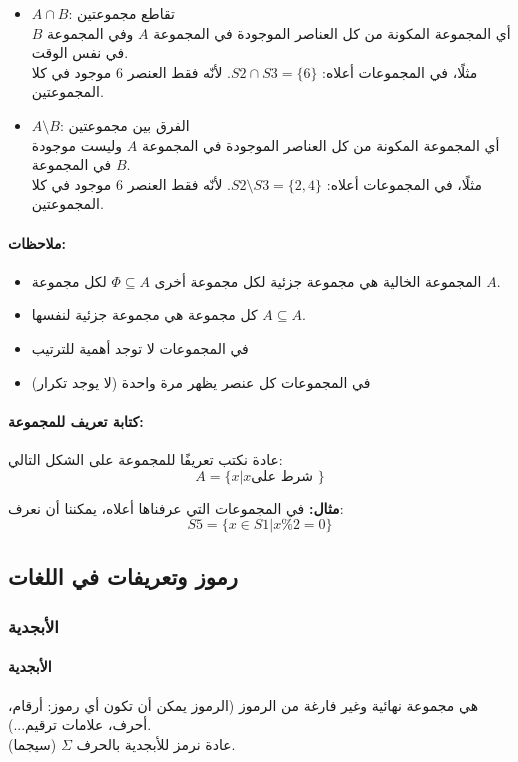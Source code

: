 \documentclass[12pt]{article}
\begin{document}
\begin{itemize}
\item $A \cap B$: تقاطع مجموعتين \\
أي المجموعة المكونة من كل العناصر الموجودة في المجموعة $A$ وفي المجموعة $B$ في نفس الوقت. \\
مثلًا، في المجموعات أعلاه: $S2 \cap S3 = \{6 \}$. لأنّه فقط العنصر 6 موجود في كلا المجموعتين.

\item $A \setminus B$: الفرق بين مجموعتين \\
أي المجموعة المكونة من كل العناصر الموجودة في المجموعة $A$ وليست موجودة في المجموعة $B$. \\
مثلًا، في المجموعات أعلاه: $S2 \setminus  S3 = \{2, 4 \}$. لأنّه فقط العنصر 6 موجود في كلا المجموعتين.

\end{itemize}

\paragraph{ملاحظات:}
\begin{itemize}
    \item المجموعة الخالية هي مجموعة جزئية لكل مجموعة أخرى $\Phi \subseteq A$ لكل مجموعة $A$.
    \item كل مجموعة هي مجموعة جزئية لنفسها $A \subseteq A$.
    \item في المجموعات لا توجد أهمية للترتيب
    \item في المجموعات كل عنصر يظهر مرة واحدة (لا يوجد تكرار)
\end{itemize}

\paragraph{كتابة تعريف للمجموعة:}
عادة نكتب تعريفًا للمجموعة على الشكل التالي:
$$A = \{ x | x \text{شرط على } \}$$

\textbf{مثال:}
في المجموعات التي عرفناها أعلاه، يمكننا أن نعرف:
$$S5 = \{ x \in S1 | x\%2=0 \}$$


\subsection{رموز وتعريفات في اللغات}

\subsubsection{الأبجدية}

\paragraph{الأبجدية} هي مجموعة نهائية وغير فارغة من الرموز (الرموز يمكن أن تكون أي رموز: أرقام، أحرف، علامات ترقيم...). \\
عادة نرمز للأبجدية بالحرف $\Sigma$ (سيجما).
\end{document}
